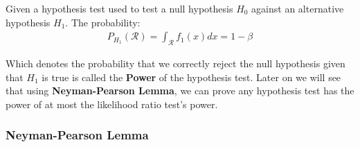 \begin{definition}
    Given a hypothesis test used to test a null hypothesis $H_0$ against an alternative hypothesis $H_1$. The probability:
    \begin{align*}
        P_{H_1}(\mathcal{R}) = \int_{\mathcal{R}} f_1(x)dx = 1 - \beta
    \end{align*}

    \noindent Which denotes the probability that we correctly reject the null hypothesis given that $H_1$ is true  is called the \textbf{Power} of the hypothesis test. Later on we will see that using \textbf{Neyman-Pearson Lemma}, we can prove any hypothesis test has the power of at most the likelihood ratio test's power. 
\end{definition}


\subsubsection{Neyman-Pearson Lemma}




